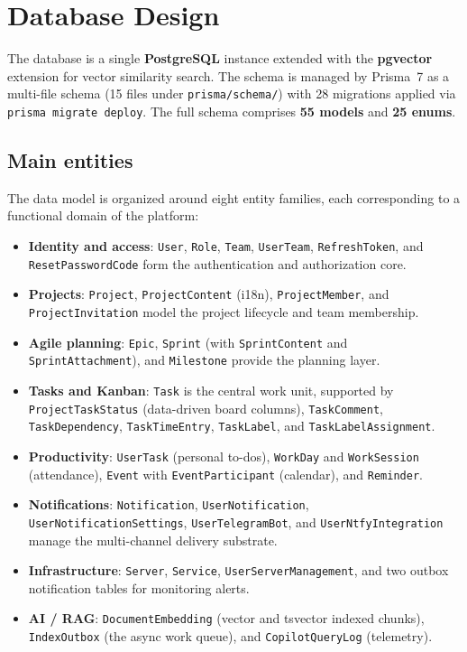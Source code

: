\section{Database Design}

The database is a single \textbf{PostgreSQL} instance extended with the \textbf{pgvector}
extension for vector similarity search. The schema is managed by Prisma~7 as a multi-file schema
(15 files under \texttt{prisma/schema/}) with 28 migrations applied via \texttt{prisma migrate
deploy}. The full schema comprises \textbf{55 models} and \textbf{25 enums}.

\subsection{Main entities}

The data model is organized around eight entity families, each corresponding to a functional
domain of the platform:

\begin{itemize}
  \item \textbf{Identity and access}: \texttt{User}, \texttt{Role}, \texttt{Team},
    \texttt{UserTeam}, \texttt{RefreshToken}, and \texttt{ResetPasswordCode} form the
    authentication and authorization core.
  \item \textbf{Projects}: \texttt{Project}, \texttt{ProjectContent} (i18n),
    \texttt{ProjectMember}, and \texttt{ProjectInvitation} model the project lifecycle and team
    membership.
  \item \textbf{Agile planning}: \texttt{Epic}, \texttt{Sprint} (with \texttt{SprintContent} and
    \texttt{SprintAttachment}), and \texttt{Milestone} provide the planning layer.
  \item \textbf{Tasks and Kanban}: \texttt{Task} is the central work unit, supported by
    \texttt{ProjectTaskStatus} (data-driven board columns), \texttt{TaskComment},
    \texttt{TaskDependency}, \texttt{TaskTimeEntry}, \texttt{TaskLabel}, and
    \texttt{TaskLabelAssignment}.
  \item \textbf{Productivity}: \texttt{UserTask} (personal to-dos), \texttt{WorkDay} and
    \texttt{WorkSession} (attendance), \texttt{Event} with \texttt{EventParticipant} (calendar),
    and \texttt{Reminder}.
  \item \textbf{Notifications}: \texttt{Notification}, \texttt{UserNotification},
    \texttt{UserNotificationSettings}, \texttt{UserTelegramBot}, and
    \texttt{UserNtfyIntegration} manage the multi-channel delivery substrate.
  \item \textbf{Infrastructure}: \texttt{Server}, \texttt{Service},
    \texttt{UserServerManagement}, and two outbox notification tables for monitoring alerts.
  \item \textbf{AI / RAG}: \texttt{DocumentEmbedding} (vector and tsvector indexed chunks),
    \texttt{IndexOutbox} (the async work queue), and \texttt{CopilotQueryLog} (telemetry).
\end{itemize}

